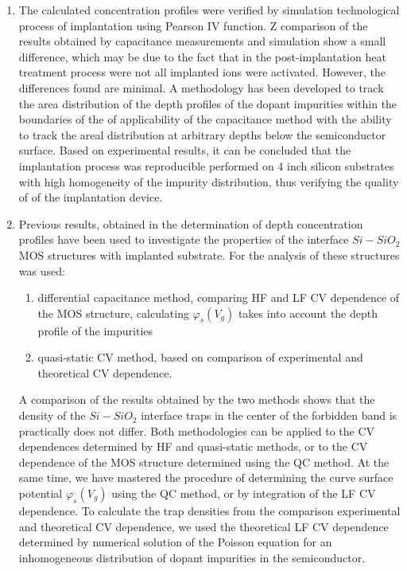 \begin{enumerate}
\item The calculated concentration profiles were verified by
  simulation technological process of implantation using Pearson IV
  function. Z comparison of the results obtained by capacitance
  measurements and simulation show a small difference, which may be
  due to the fact that in the post-implantation heat treatment process
  were not all implanted ions were activated. However, the differences
  found are minimal. A methodology has been developed to track the
  area distribution of the depth profiles of the dopant impurities
  within the boundaries of the of applicability of the capacitance
  method with the ability to track the areal distribution at arbitrary
  depths below the semiconductor surface. Based on experimental
  results, it can be concluded that the implantation process was
  reproducible performed on 4 inch silicon substrates with high
  homogeneity of the impurity distribution, thus verifying the quality
  of of the implantation device.


\item Previous results, obtained in the determination of depth
  concentration profiles have been used to investigate the properties
  of the interface $Si-SiO_{2}$ MOS structures with implanted
  substrate. For the analysis of these structures was used:

  \begin{enumerate}
  \item differential capacitance method, comparing HF and LF CV
    dependence of the MOS structure, calculating $\varphi_{s} (V_{g})$
    takes into account the depth profile of the impurities
  \item quasi-static CV method, based on comparison of experimental
    and theoretical CV dependence.
  \end{enumerate}

  A comparison of the results obtained by the two methods shows that
  the density of the $Si-SiO_{2}$ interface traps in the center of the
  forbidden band is practically does not differ. Both methodologies
  can be applied to the CV dependences determined by HF and
  quasi-static methods, or to the CV dependence of the MOS structure
  determined using the QC method. At the same time, we have mastered
  the procedure of determining the curve surface potential
  $\varphi_s (V_g)$ using the QC method, or by integration of the LF
  CV dependence. To calculate the trap densities from the comparison
  experimental and theoretical CV dependence, we used the theoretical
  LF CV dependence determined by numerical solution of the Poisson
  equation for an inhomogeneous distribution of dopant impurities in
  the semiconductor.


\end{enumerate}
